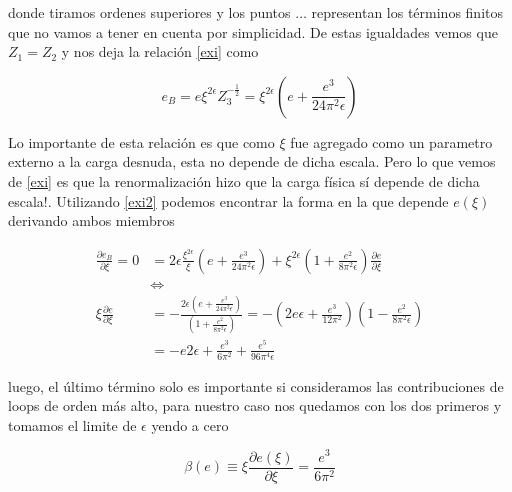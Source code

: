 \documentclass[tickz]{article}
\numberwithin{equation}{section}
\begin{document}
donde tiramos ordenes superiores y los puntos $ \dots $ representan los términos finitos que no vamos a tener en cuenta por simplicidad. De estas igualdades vemos que $ Z_1=Z_2 $ y nos deja la relación \ref{exi} como

\begin{equation}\label{exi2}
e_B = e\xi^{2\epsilon}Z_3^{-\frac{1}{2}}  = \xi^{2\epsilon}\left(e +\frac{e^3}{24\pi^2 \epsilon}\right)
\end{equation}


Lo importante de esta relación es que como $ \xi $ fue agregado como un parametro externo a la carga desnuda, esta no depende de dicha escala. Pero lo que vemos de \ref{exi} es que  la renormalización hizo que la carga física sí depende de dicha escala!. Utilizando \ref{exi2} podemos encontrar la forma en la que depende $ e(\xi) $ derivando ambos miembros

\begin{equation}\label{key}
\begin{aligned}
\frac{\partial e_B}{\partial \xi} = 0 &= 2\epsilon\frac{\xi^{2\epsilon}}{\xi} \left(e +\frac{e^3}{24\pi^2 \epsilon}\right) +  \xi^{2\epsilon} \left(1 + \frac{e^2}{8 \pi^2 \epsilon}\right)\frac{\partial e}{\partial \xi}\\
& \iff\\
\xi \frac{\partial e}{\partial \xi} &= -\frac{2\epsilon\left(e +\frac{e^3}{24\pi^2 \epsilon}\right)}{\left(1 + \frac{e^2}{8 \pi^2 \epsilon}\right)} = -\left(2e\epsilon +\frac{e^3}{12\pi^2}\right)\left(1 - \frac{e^2}{8 \pi^2 \epsilon}\right)\\
&=-e2\epsilon + \frac{e^3}{6\pi^2} + \frac{e^5}{96\pi^4 \epsilon}
\end{aligned}
\end{equation}
 
 luego, el último término solo es importante si consideramos las contribuciones de loops de orden más alto, para nuestro caso nos quedamos con los dos primeros y tomamos el limite de $ \epsilon $ yendo a cero
 
\begin{boxquation}
\begin{equation}\label{beta}
\beta(e) \equiv \xi \frac{\partial e(\xi)}{\partial \xi} =  \frac{e^3}{6\pi^2}
\end{equation}
\end{boxquation}
\end{document}
